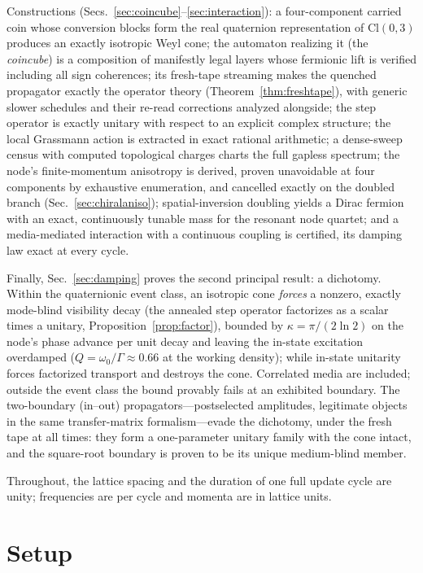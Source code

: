 \documentclass[aps,prd,twocolumn,superscriptaddress,nofootinbib,floatfix]{revtex4-2}
\begin{document}
Constructions (Secs.~\ref{sec:coincube}--\ref{sec:interaction}): a
four-component carried coin whose conversion blocks form the real
quaternion representation of $\mathrm{Cl}(0,3)$ produces an exactly
isotropic Weyl cone; the automaton realizing it (the \emph{coincube}) is a
composition of manifestly legal layers whose fermionic lift is
verified including all sign coherences; its fresh-tape streaming makes
the quenched propagator exactly the operator theory
(Theorem~\ref{thm:freshtape}), with generic slower schedules and their
re-read corrections analyzed alongside; the step operator is exactly
unitary with respect to an explicit complex structure; the local Grassmann
action is extracted in exact rational arithmetic; a dense-sweep census
with computed topological charges charts the full gapless spectrum; the
node's finite-momentum anisotropy is derived, proven unavoidable at
four components by exhaustive enumeration, and cancelled exactly on the
doubled branch (Sec.~\ref{sec:chiralaniso});
spatial-inversion doubling yields a Dirac fermion with an exact,
continuously tunable mass for the resonant node quartet; and a
media-mediated interaction with a continuous coupling is certified, its
damping law exact at every cycle.

Finally, Sec.~\ref{sec:damping} proves the second
principal result: a dichotomy. Within the quaternionic event class, an
isotropic cone \emph{forces} a nonzero, exactly mode-blind visibility
decay (the annealed step operator factorizes as a scalar times a
unitary, Proposition~\ref{prop:factor}), bounded by
$\kappa=\pi/(2\ln2)$ on the node's phase advance per unit decay and
leaving the in-state excitation overdamped
($Q=\omega_0/\Gamma\approx0.66$ at the working density); while in-state
unitarity forces factorized transport and destroys the cone. Correlated
media are included; outside the event class the bound provably fails at
an exhibited boundary. The two-boundary (in--out)
propagators---postselected amplitudes, legitimate objects in the same
transfer-matrix formalism---evade the dichotomy, under the fresh tape
at all times: they form a one-parameter unitary family with the cone
intact,
and the square-root boundary is proven to be its unique medium-blind
member.

Throughout, the lattice spacing and the duration of one full update cycle
are unity; frequencies are per cycle and momenta are in lattice units.

\section{Setup}
\label{sec:setup}
\end{document}
